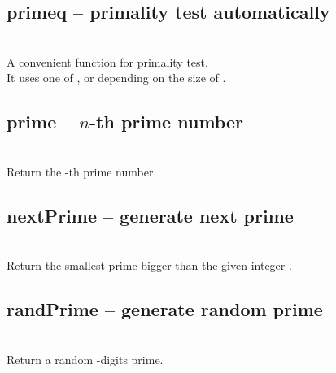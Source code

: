  \subsection{primeq -- primality test automatically}
   {}{}\\
   \spacing
   \quad A convenient function for primality test.\\
   \spacing
   \quad It uses one of ,  or  depending on the size of .
   \spacing
%
%
 \subsection{prime -- $n$-th prime number}
   {}{}\\
   \spacing
   \quad Return the -th prime number.\\
   \spacing
%
 \subsection{nextPrime -- generate next prime}
   {}{}\\
   \spacing
   \quad Return the smallest prime bigger than the given integer .
   \spacing
%
 \subsection{randPrime -- generate random prime}
   {}{}\\
   \spacing
   \quad Return a random -digits prime.\\
   \spacing
%
